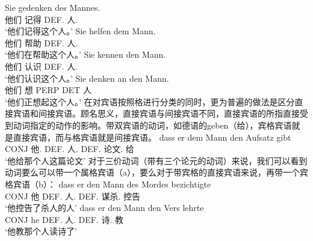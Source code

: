 \eal
\ex 
\gll Sie gedenken des Mannes.\\
	 他们 记得 DEF.\gen{} 人.\gen{}\\
\glt `他们记得这个人。'
\ex 
\gll Sie helfen dem Mann.\\
	 他们 帮助 DEF.\dat{} 人.\dat{}\\
\glt `他们在帮助这个人。'
\ex 
\gll Sie kennen den Mann.\\
	 他们 认识 DEF.\acc{} 人.\acc{}\\
\glt `他们认识这个人。'
\ex 
\gll Sie denken an den Mann.\\
	 他们 想 PERP DET 人\\
\glt `他们正想起这个人。'
\zl
在对宾语按照格进行分类的同时，更为普遍的做法是区分直接宾语和间接宾语。顾名思义，直接宾语与间接宾语不同，直接宾语的所指直接受到动词指定的动作的影响。带双宾语的动词，如德语的geben（给），宾格宾语就是直接宾语，而与格宾语就是间接宾语。
\ea
\gll dass er dem Mann den Aufsatz gibt\\
	 CONJ 他.\nom{} DEF.\dat{} 人.\dat{} DEF.\acc{} 论文.\acc{} 给\\
\glt `他给那个人这篇论文'
\z
对于三价动词（带有三个论元的动词）来说，我们可以看到动词要么可以带一个属格宾语（a），要么对于带宾格的直接宾语来说，再带一个宾格宾语（b）：
\eal
\ex 
\gll dass er den Mann des Mordes bezichtigte\\
	 CONJ 他 DEF.\acc{} 人.\acc{} DEF.\gen{} 谋杀.\gen{} 控告\\
\glt `他控告了杀人的人'
\ex 
\gll dass er den Mann den Vers lehrte\\
	 CONJ he DEF.\acc{} 人.\acc{} DEF.\acc{} 诗.\acc{} 教\\
\glt `他教那个人读诗了'

